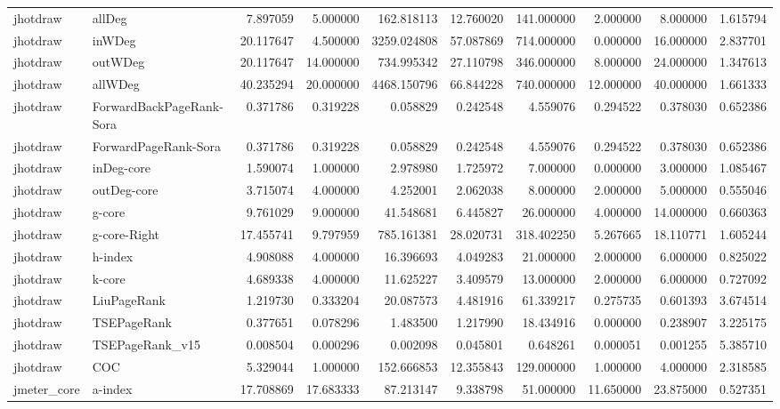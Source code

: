 \begin{tabular}{llrrrrrrrr}
jhotdraw & allDeg & 7.897059 & 5.000000 & 162.818113 & 12.760020 & 141.000000 & 2.000000 & 8.000000 & 1.615794 \\
jhotdraw & inWDeg & 20.117647 & 4.500000 & 3259.024808 & 57.087869 & 714.000000 & 0.000000 & 16.000000 & 2.837701 \\
jhotdraw & outWDeg & 20.117647 & 14.000000 & 734.995342 & 27.110798 & 346.000000 & 8.000000 & 24.000000 & 1.347613 \\
jhotdraw & allWDeg & 40.235294 & 20.000000 & 4468.150796 & 66.844228 & 740.000000 & 12.000000 & 40.000000 & 1.661333 \\
jhotdraw & ForwardBackPageRank-Sora & 0.371786 & 0.319228 & 0.058829 & 0.242548 & 4.559076 & 0.294522 & 0.378030 & 0.652386 \\
jhotdraw & ForwardPageRank-Sora & 0.371786 & 0.319228 & 0.058829 & 0.242548 & 4.559076 & 0.294522 & 0.378030 & 0.652386 \\
jhotdraw & inDeg-core & 1.590074 & 1.000000 & 2.978980 & 1.725972 & 7.000000 & 0.000000 & 3.000000 & 1.085467 \\
jhotdraw & outDeg-core & 3.715074 & 4.000000 & 4.252001 & 2.062038 & 8.000000 & 2.000000 & 5.000000 & 0.555046 \\
jhotdraw & g-core & 9.761029 & 9.000000 & 41.548681 & 6.445827 & 26.000000 & 4.000000 & 14.000000 & 0.660363 \\
jhotdraw & g-core-Right & 17.455741 & 9.797959 & 785.161381 & 28.020731 & 318.402250 & 5.267665 & 18.110771 & 1.605244 \\
jhotdraw & h-index & 4.908088 & 4.000000 & 16.396693 & 4.049283 & 21.000000 & 2.000000 & 6.000000 & 0.825022 \\
jhotdraw & k-core & 4.689338 & 4.000000 & 11.625227 & 3.409579 & 13.000000 & 2.000000 & 6.000000 & 0.727092 \\
jhotdraw & LiuPageRank & 1.219730 & 0.333204 & 20.087573 & 4.481916 & 61.339217 & 0.275735 & 0.601393 & 3.674514 \\
jhotdraw & TSEPageRank & 0.377651 & 0.078296 & 1.483500 & 1.217990 & 18.434916 & 0.000000 & 0.238907 & 3.225175 \\
jhotdraw & TSEPageRank_v15 & 0.008504 & 0.000296 & 0.002098 & 0.045801 & 0.648261 & 0.000051 & 0.001255 & 5.385710 \\
jhotdraw & COC & 5.329044 & 1.000000 & 152.666853 & 12.355843 & 129.000000 & 1.000000 & 4.000000 & 2.318585 \\
jmeter_core & a-index & 17.708869 & 17.683333 & 87.213147 & 9.338798 & 51.000000 & 11.650000 & 23.875000 & 0.527351 \\

\end{tabular}
